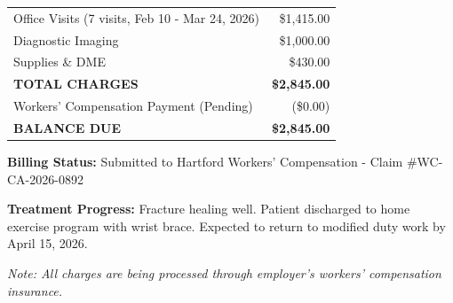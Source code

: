 \documentclass[11pt]{article}
\begin{document}
\begin{tabular}{@{}p{10cm}r@{}}
Office Visits (7 visits, Feb 10 - Mar 24, 2026) & \$1,415.00 \\
Diagnostic Imaging & \$1,000.00 \\
Supplies \& DME & \$430.00 \\
\midrule
\textbf{TOTAL CHARGES} & \textbf{\$2,845.00} \\
\midrule
Workers' Compensation Payment (Pending) & (\$0.00) \\
\textbf{BALANCE DUE} & \textbf{\$2,845.00} \\
\end{tabular}

\vspace{1.5em}

\textbf{Billing Status:} Submitted to Hartford Workers' Compensation - Claim \#WC-CA-2026-0892

\vspace{0.5em}
\textbf{Treatment Progress:} Fracture healing well. Patient discharged to home exercise program with wrist brace. Expected to return to modified duty work by April 15, 2026.

\vspace{0.5em}
\small
\textit{Note: All charges are being processed through employer's workers' compensation insurance.}
\end{document}
